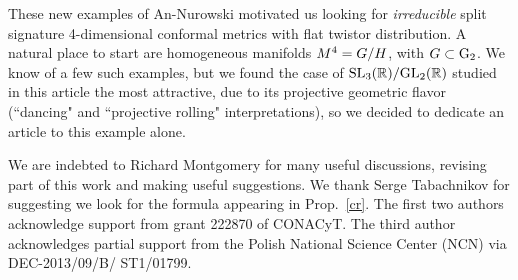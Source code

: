 These new examples   of An-Nurowski motivated us looking for {\em irreducible} split signature 4-dimensional conformal metrics with flat twistor distribution. A natural place to start are homogeneous manifolds $M^4=G/H$, with $G\subset {\rm G}_2$. We know of a few such examples, but we found the case of  $\mathrm{SL}_3(\mathbb{R})/\mathrm{GL}_2(\mathbb{R})$ studied in this article  the most attractive, due to its  projective geometric flavor (``dancing"  and ``projective rolling" interpretations), so we decided to dedicate an article to this example alone. 

  We are indebted to Richard Montgomery for many useful discussions,  revising  part of this work and making useful suggestions. We thank Serge Tabachnikov for suggesting we look for the formula appearing in Prop.~\ref{cr}. The first two authors   acknowledge support from grant 222870 of CONACyT. The third author acknowledges partial support from the Polish National Science Center (NCN) via DEC-2013/09/B/ ST1/01799. 
 



